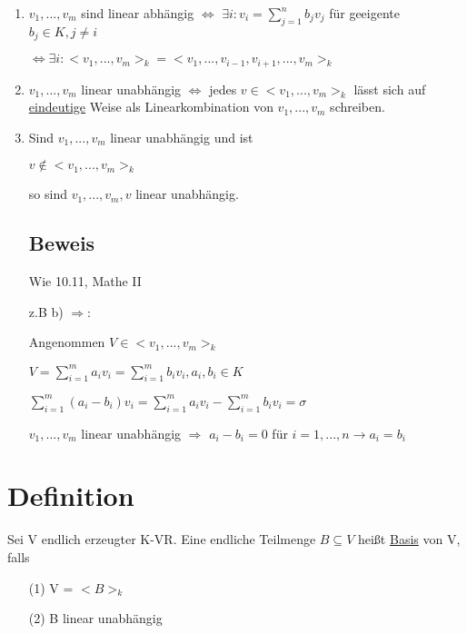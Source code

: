 \documentclass[a4paper, openany]{book}
\begin{document}
    \begin{enumerate}[label=(\alph*)]
      \item $v_1, ..., v_m$ sind linear abhängig $\Leftrightarrow$ $\exists i : v_i = \sum_{j=1}^{n} b_jv_j$ für geeigente $b_j \in K, j \neq i$

      $\Leftrightarrow \exists i : <v_1,...,v_m>_k = <v_1,...,v_{i-1}, v_{i+1}, ..., v_m>_k$

      \item $v_1, ..., v_m$ linear unabhängig $\Leftrightarrow$ jedes $v \in <v_1,...,v_m>_k$ lässt sich auf \underline{eindeutige} Weise als Linearkombination von $v_1,...,v_m$ schreiben.

      \item Sind $v_1,...,v_m$ linear unabhängig und ist 

      \begin{center}
        $v \not \in <v_1,...,v_m>_k$
      \end{center}

      so sind $v_1,...,v_m,v$ linear unabhängig.

      \subsection{Beweis}

      Wie 10.11, Mathe II

      z.B b) $\Rightarrow$: 

      Angenommen $V \in <v_1,...,v_m>_k$

      $V = \sum_{i=1}^{m} a_iv_i = \sum_{i=1}^{m} b_i v_i, a_i,b_i \in K$

      $\sum_{i=1}^{m} (a_i - b_i) v_i = \sum_{i=1}^{m}a_iv_i - \sum_{i=1}^{m} b_i v_i = \sigma$

      $v_1,...,v_m$ linear unabhängig $\Rightarrow$ $a_i - b_i = 0$ für $i = 1,...,n \rightarrow a_i = b_i$
    \end{enumerate}

    \section{Definition}

    Sei V endlich erzeugter K-VR. Eine endliche Teilmenge $B \subseteq V$ heißt \underline{Basis} von V, falls

    \begin{enumerate}
      \item[(1)] V = $<B>_k$
      \item[(2)] B linear unabhängig
    \end{enumerate}
\end{document}
